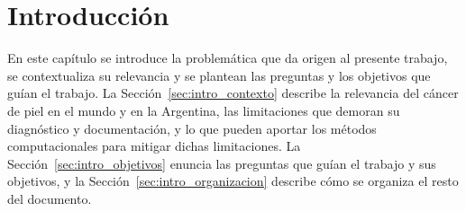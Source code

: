 \chapter[Introducción]{Introducción}
\label{cp:introduccion}

En este capítulo se introduce la problemática que da origen al presente trabajo, se contextualiza su relevancia
y se plantean las preguntas y los objetivos que guían el trabajo. La Sección~\ref{sec:intro_contexto}
describe la relevancia del cáncer de piel en el mundo y en la Argentina, las limitaciones que demoran su
diagnóstico y documentación, y lo que pueden aportar los métodos computacionales para mitigar dichas limitaciones. 
La Sección~\ref{sec:intro_objetivos} enuncia las preguntas que guían el trabajo y sus objetivos, y la
Sección~\ref{sec:intro_organizacion} describe cómo se organiza el resto del documento.




